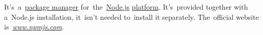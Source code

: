 \label{npm}
It's~a~\hyperref[packagemanager]{package manager} for~the~\hyperref[nodejs]{Node.js} \hyperref[platform]{platform}.
It's~provided together with a~Node.js installation, it~isn't needed to~install it separately.
The~official website is~\href{https://www.npmjs.com/}{\textit{www.npmjs.com}}.

